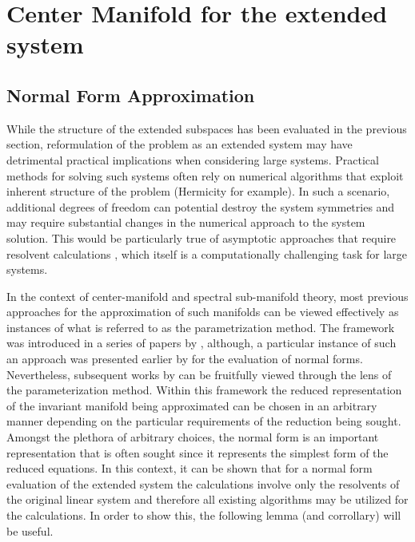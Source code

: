 \section{Center Manifold for the extended system}
\label{sec:center_manifold_derivation}

\subsection{Normal Form Approximation}
\label{sec:normal_1}

While the structure of the extended subspaces has been evaluated in the previous section, reformulation of the problem as an extended system may have detrimental practical implications when considering large systems. Practical methods for solving such systems often rely on numerical algorithms that exploit inherent structure of the problem (Hermicity for example). In such a scenario, additional degrees of freedom can potential destroy the system symmetries and may require substantial changes in the numerical approach to the system solution. This would be particularly true of asymptotic approaches that require resolvent calculations \citep{coullet83,cabre05,sipp07,haragus11,carini15,gallaire16,haro16,jain22,negi24}, which itself is a computationally challenging task for large systems.

In the context of center-manifold and spectral sub-manifold theory, most previous approaches for the approximation of such manifolds can be viewed effectively as instances of what is referred to as the parametrization method. The framework was introduced in a series of papers by \cite{cabre03a,cabre03b,cabre05}, although, a particular instance of such an approach was presented earlier by \cite{coullet83} for the evaluation of normal forms. Nevertheless, subsequent works by \cite{carini15,jain22,negi24} can be fruitfully viewed through the lens of the parameterization method. Within this framework the reduced representation of the invariant manifold being approximated can be chosen in an arbitrary manner depending on the particular requirements of the reduction being sought. Amongst the plethora of arbitrary choices, the normal form is an important representation that is often sought since it represents the simplest form of the reduced equations. In this context, it can be shown that for a normal form evaluation of the extended system the calculations involve only the resolvents of the original linear system and therefore all existing algorithms may be utilized for the calculations. In order to show this, the following lemma (and corrollary) will be useful.

